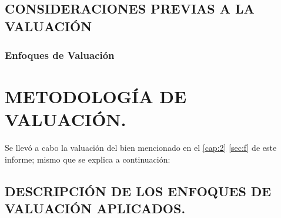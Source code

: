 \documentclass[10pt,letter]{report}
\begin{document}

\newpage




\espacio{1cm}

\section{CONSIDERACIONES PREVIAS A LA VALUACI\'ON}\label{sec:j}

	
	
	
	
	
	\subsection{Enfoques de Valuaci\'on}
	

\espacio{7cm}
	
	
	\begin{center}
 	\printnoidxglossary[type=\acronymtype,title={Acr\'onimos}]
	\printnoidxglossary
	\end{center}
	
	
\chapter{METODOLOG\'IA DE VALUACI\'ON.}\label{cap:4}
\thispagestyle{fancy}

Se llev\'o a cabo la valuaci\'on del bien mencionado en el \autoref{cap:2}  \autoref{sec:f} de este informe; mismo que se explica a continuaci\'on:

\setcounter{section}{10}
\section{DESCRIPCI\'ON DE LOS ENFOQUES DE VALUACI\'ON APLICADOS.}\label{sec:k}

\renewcommand\thefigure{\arabic{figure}} 

%
\end{document}

